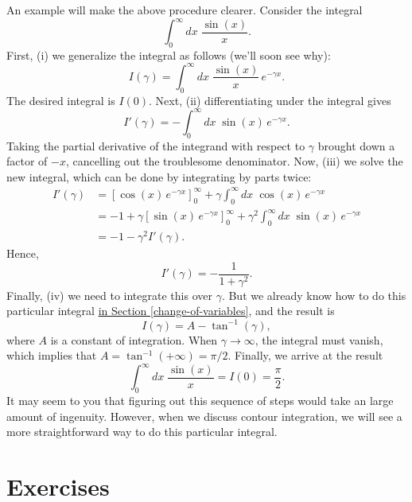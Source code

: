 \documentclass[10pt,a4paper]{article}
\begin{document}
An example will make the above procedure clearer. Consider the
integral
\begin{equation}
  \int_{0}^\infty dx \; \frac{\sin(x)}{x}.
\end{equation}
First, (i) we generalize the integral as follows (we'll soon see why):
\begin{equation}
  I(\gamma) = \int_{0}^\infty dx \; \frac{\sin(x)}{x}\, e^{-\gamma x}.
\end{equation}
The desired integral is $I(0)$. Next, (ii) differentiating under the
integral gives
\begin{equation}
  I'(\gamma) = - \int_{0}^\infty dx \; \sin(x)\, e^{-\gamma x}.
\end{equation}
Taking the partial derivative of the integrand with respect to
$\gamma$ brought down a factor of $-x$, cancelling out the troublesome
denominator. Now, (iii) we solve the new integral, which can be done
by integrating by parts twice:
\begin{align}
  I'(\gamma) &= \left[\cos(x)\,e^{-\gamma x}\right]_0^\infty + \gamma \int_{0}^\infty dx \; \cos(x)\, e^{-\gamma x} \\
  &= -1 + \gamma \left[\sin(x)\,e^{-\gamma x}\right]_0^\infty + \gamma^2 \int_{0}^\infty dx \; \sin(x)\, e^{-\gamma x}\\
  &= -1 - \gamma^2 I'(\gamma).
\end{align}
Hence,
\begin{equation}
  I'(\gamma) = - \frac{1}{1+\gamma^2}.
\end{equation}
Finally, (iv) we need to integrate this over $\gamma$.  But we already
know how to do this particular integral
\hyperref[change-of-variables]{in Section \ref{change-of-variables}},
and the result is
\begin{equation}
  I(\gamma) = A - \tan^{-1}(\gamma),
\end{equation}
where $A$ is a constant of integration. When $\gamma \rightarrow
\infty$, the integral must vanish, which implies that $A =
\tan^{-1}(+\infty) = \pi/2$. Finally, we arrive at the result
\begin{equation}
  \int_{0}^\infty dx \; \frac{\sin(x)}{x} = I(0) = \frac{\pi}{2}.
\end{equation}
It may seem to you that figuring out this sequence of steps would take
an large amount of ingenuity.  However, when we discuss contour
integration, we will see a more straightforward way to do this
particular integral.

\section{Exercises}
\label{exercises}
\end{document}
